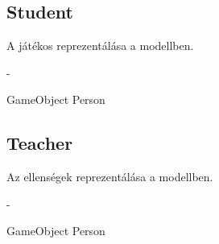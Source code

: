 \subsection{Student}
\begin{class-template-responsibility}
    A játékos reprezentálása a modellben.
\end{class-template-responsibility}
\begin{class-template-interface}
    -
\end{class-template-interface}
\begin{class-template-baseclass}
    GameObject \baseclass Person
\end{class-template-baseclass}
\begin{class-template-attribute}
\end{class-template-attribute}
\begin{class-template-method}
\end{class-template-method}

\subsection{Teacher}
\begin{class-template-responsibility}
    Az ellenségek reprezentálása a modellben.
\end{class-template-responsibility}
\begin{class-template-interface}
    -
\end{class-template-interface}
\begin{class-template-baseclass}
    GameObject \baseclass Person
\end{class-template-baseclass}
\begin{class-template-attribute}
\end{class-template-attribute}
\begin{class-template-method}
\end{class-template-method}

